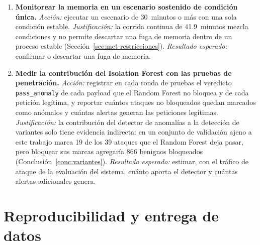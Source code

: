 \begin{enumerate}
    \item \textbf{Monitorear la memoria en un escenario sostenido de condición única.}
    \textit{Acción:} ejecutar un escenario de 30~minutos o más con una sola condición estable.
    \textit{Justificación:} la corrida continua de 41.9~minutos mezcla condiciones y no permite
    descartar una fuga de memoria dentro de un proceso estable (Sección~\ref{sec:met-restricciones}).
    \textit{Resultado esperado:} confirmar o descartar una fuga de memoria.

    \item \textbf{Medir la contribución del Isolation Forest con las pruebas de penetración.}
    \textit{Acción:} registrar en cada ronda de pruebas el veredicto \texttt{pass\_anomaly} de cada
    payload que el Random Forest no bloquea y de cada petición legítima, y reportar cuántos
    ataques no bloqueados quedan marcados como anómalos y cuántas alertas generan las peticiones
    legítimas. \textit{Justificación:} la contribución del detector de anomalías a la detección de
    variantes solo tiene evidencia indirecta: en un conjunto de validación ajeno a este trabajo marca
    19 de los 39 ataques que el Random Forest deja pasar, pero bloquear sus marcas agregaría 866
    benignos bloqueados \cite{valenzuela2026ia} (Conclusión~\ref{conc:variantes}).
    \textit{Resultado esperado:} estimar, con el tráfico de ataque de la evaluación del sistema,
    cuánto aporta el detector y cuántas alertas adicionales genera.
\end{enumerate}

\section{Reproducibilidad y entrega de datos}

